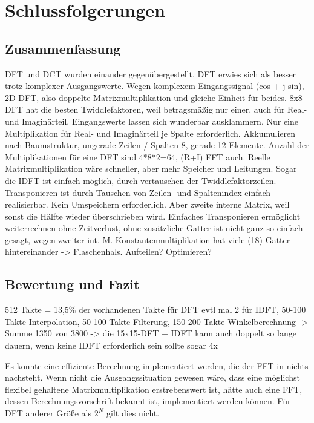 
 
 
 \chapter{Schlussfolgerungen}
 \section{Zusammenfassung}
 DFT und DCT wurden einander gegenübergestellt, DFT erwies sich als besser trotz komplexer Ausgangswerte. Wegen komplexem Eingangssignal (cos + j sin), 2D-DFT, also 
 doppelte Matrixmultiplikation und gleiche Einheit für beides.
 8x8-DFT hat die besten Twiddlefaktoren, weil betragsmäßig nur einer, auch für Real- und Imaginärteil. Eingangswerte lassen sich wunderbar ausklammern.
 Nur eine Multiplikation für Real- und Imaginärteil je Spalte erforderlich. Akkumulieren nach Baumstruktur, ungerade Zeilen / Spalten 8, gerade 12 Elemente.
 Anzahl der Multiplikationen für eine DFT sind 4*8*2=64, (R+I) FFT auch.
 Reelle Matrixmultiplikation wäre schneller, aber mehr Speicher und Leitungen.
 Sogar die IDFT ist einfach möglich, durch vertauschen der Twiddlefaktorzeilen.
 Transponieren ist durch Tauschen von Zeilen- und Spaltenindex einfach realisierbar. Kein Umspeichern erforderlich. Aber zweite interne Matrix, weil sonst die Hälfte wieder überschrieben wird.
 Einfaches Transponieren ermöglicht weiterrechnen ohne Zeitverlust, ohne zusätzliche Gatter ist nicht ganz so einfach gesagt, wegen zweiter int. M.
 Konstantenmultiplikation hat viele (18) Gatter hintereinander -> Flaschenhals. Aufteilen? Optimieren?
 
 
 
 \section{Bewertung und Fazit}
 512 Takte = 13,5\% der vorhandenen Takte für DFT evtl mal 2 für IDFT, 50-100 Takte Interpolation, 50-100 Takte Filterung, 150-200 Takte Winkelberechnung -> Summe 1350 von 3800 
 -> die 15x15-DFT + IDFT kann auch doppelt so lange dauern, wenn keine IDFT erforderlich sein sollte sogar 4x
 
 
 Es konnte eine effiziente Berechnung implementiert werden, die der FFT in nichts nachsteht. Wenn nicht die Ausgangssituation gewesen wäre, dass eine möglichst flexibel gehaltene
 Matrixmultiplikation erstrebenswert ist, hätte auch eine FFT, dessen Berechnungsvorschrift bekannt ist, implementiert werden können. Für DFT anderer Größe als $2^N$ gilt dies nicht.
 
